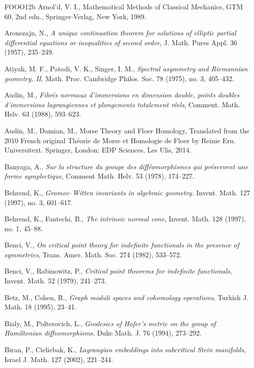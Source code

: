 \begin{thebibliography}{FOOO12b}
 Arnol’d, V. I., Mathematical Methods of Classical Mechanics, GTM 60, 2nd edn.,
  Springer-Verlag, New York, 1989.

 Aronszajn, N., \emph{A unique continuation theorem for solutions of elliptic
  partial diﬀerential equations or inequalities of second order}, J. Math. Pures Appl. 36 (1957),
  235–249.

 Atiyah, M. F., Patodi, V. K., Singer, I. M., \emph{Spectral asymmetry and
  Rie\-mannian geometry. II}, Math. Proc. Cambridge Philos. Soc. 78 (1975), no. 3, 405–432.

 Audin, M., \emph{Fibrés normaux d’immersions en dimension double, points doubles
  d’immersions lagrangiennes et plongements totalement réels}, Comment. Math. Helv. 63 (1988), 593–623.

 Audin, M., Damian, M., Morse Theory and Floer Homology, Translated from the 2010
  French original Théorie de Morse et Homologie de Floer by Reinie Ern. Universitext. Springer, London;
  EDP Sciences, Les Ulis, 2014.

 Banyaga, A., \emph{Sur la structure du groupe des diﬀéomorphismes qui préservent une
  forme symplectique}, Comment Math. Helv. 53 (1978), 174–227.

 Behrend, K., \emph{Gromov–Witten invariants in algebraic geometry.} Invent. Math.
  127 (1997), no. 3, 601–617.

 Behrend, K., Fantechi, B., \emph{The intrinsic normal cone}, Invent. Math. 128
  (1997), no. 1, 45–88.

 Benci, V., \emph{On critical point theory for indefinite functionals in the presence
  of symmetries}, Trans. Amer. Math. Soc. 274 (1982), 533–572.

 Benci, V., Rabinowitz, P., \emph{Critical point theorems for indefinite
  function\-als}, Invent. Math. 52 (1979), 241–273.

 Betz, M., Cohen, R., \emph{Graph moduli spaces and cohomology operations}, Turkish
  J. Math. 18 (1995), 23–41.

 Bialy, M., Polterovich, L., \emph{Geodesics of Hofer’s metric on the group of
  Hamiltonian diﬀeomorphisms}, Duke Math. J. 76 (1994), 273–292.

 Biran, P., Cieliebak, K., \emph{Lagrangian embeddings into subcritical Stein
  manifolds}, Israel J. Math. 127 (2002), 221–244.


\end{thebibliography}
